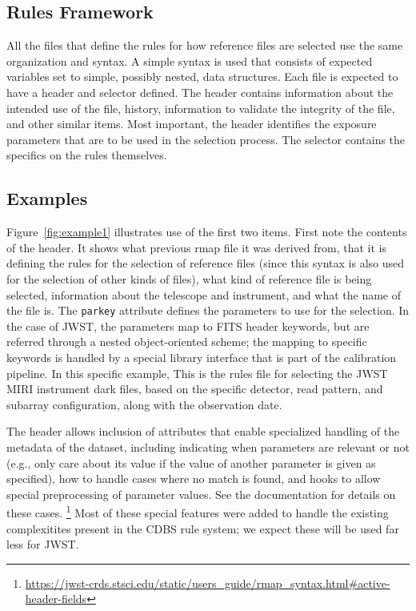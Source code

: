 \documentclass[final,authoryear,5p,times,twocolumn]{elsarticle}
\begin{document}
\subsection{Rules Framework}

All the files that define the rules for how reference files are selected
use the same organization and syntax.
A simple syntax is used that consists of expected variables set to simple, 
possibly nested, data structures. Each file is expected to have a header 
and selector defined. The header contains information about the intended 
use of the file, history, information to validate the integrity of the file,
and other similar items. Most important, the header identifies the exposure
parameters that are to be used in the selection process. The selector 
contains the specifics on the rules themselves.

\subsection{Examples}

Figure~\ref{fig:example1} illustrates use of the first two items. First note the contents
of the header. It shows what previous rmap file it was derived from, that it is defining
the rules for the selection of reference files (since this syntax is also used for
the selection of other kinds of files), what kind of reference file is being selected, information about the telescope and instrument, and what the name of the file is. 
The {\tt parkey} attribute defines the parameters to use for the selection. In the
case of JWST, the parameters map to FITS header keywords, but are referred through a
nested object-oriented scheme; the mapping to specific keywords is handled by a special
library interface that is part of the calibration pipeline. In this specific example,
This is the rules file for selecting the JWST MIRI instrument dark files, based on 
the specific detector, read pattern, and subarray configuration, along with the 
observation date.

The header allows inclusion of attributes that enable specialized handling of the metadata 
of the dataset, including indicating when parameters are relevant or not (e.g., only 
care about its value if the value of another parameter is given as specified), 
how to handle cases where no match is found, and hooks to allow special preprocessing
of parameter values. See the documentation for details on these 
cases.
\footnote{\url{https://jwst-crds.stsci.edu/static/users\_guide/rmap_syntax.html\#active-header-fields}}
Most of these special features were added to handle the existing complexitites present in the CDBS rule system; we expect these will be used far less for JWST.
\end{document}
